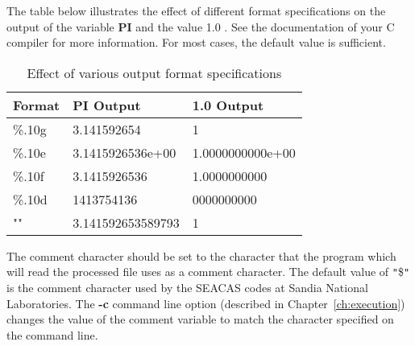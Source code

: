 The table below illustrates the effect of different format
specifications on the output of the variable \textbf{PI} and the value
1.0 . See the documentation of your C compiler for more
information. For most cases, the default value is sufficient.

\begin{longtable}{lll}
\caption{Effect of various output format specifications}\\
Format & PI Output & 1.0 Output \\
\hline
\%.10g &  3.141592654      & 1  \\
\%.10e &  3.1415926536e+00 & 1.0000000000e+00  \\
\%.10f &  3.1415926536     & 1.0000000000  \\
\%.10d &  1413754136       & 0000000000  \\
""  &  3.141592653589793 & 1 \\
\end{longtable}

The comment character should be set to the character that the program
which will read the processed file uses as a comment character. The
default value of \texttt{"}\$\texttt{"} is the comment character used
by the SEACAS codes at Sandia National Laboratories.  The \textbf{-c}
command line option (described in Chapter~\ref{ch:execution}) changes
the value of the comment variable to match the character specified on
the command line.

